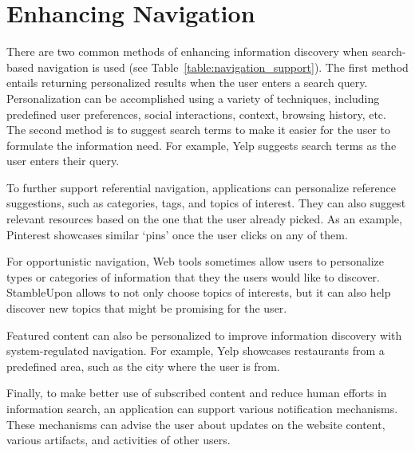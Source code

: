 {\section{Enhancing Navigation}
There are two common methods of enhancing information discovery when search-based navigation is used (see Table~\ref{table:navigation_support}). The first method entails returning personalized results when the user enters a search query. Personalization can be accomplished using a variety of techniques, including predefined user preferences, social interactions, context, browsing history, etc. The second method is to suggest search terms to make it easier for the user to formulate the information need. For example, Yelp suggests search terms as the user enters their query.

To further support referential navigation, applications can personalize reference suggestions, such as categories, tags, and topics of interest. They can also suggest relevant resources based on the one that the user already picked. As an example, Pinterest showcases similar `pins' once the user clicks on any of them.

For opportunistic navigation, Web tools sometimes allow users to personalize types or categories of information that they the users would like to discover. StambleUpon allows to not only choose topics of interests, but it can also help discover new topics that might be promising for the user.

Featured content can also be personalized to improve information discovery with system-regulated navigation. For example, Yelp showcases restaurants from a predefined area, such as the city where the user is from.

Finally, to make better use of subscribed content and reduce human efforts in information search, an application can support various notification mechanisms. These mechanisms can advise the user about updates on the website content, various artifacts, and activities of other users.  

}
